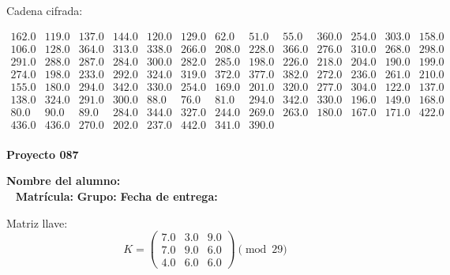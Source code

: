 \documentclass[12pt]{article}
\begin{document}
Cadena cifrada:
\begin{center}
$\begin{array}{lllllllllllll}
162.0 & 119.0 & 137.0 & 144.0 & 120.0 & 129.0 & 62.0 & 51.0 & 55.0 & 360.0 & 254.0 & 303.0 & 158.0\\
106.0 & 128.0 & 364.0 & 313.0 & 338.0 & 266.0 & 208.0 & 228.0 & 366.0 & 276.0 & 310.0 & 268.0 & 298.0\\
291.0 & 288.0 & 287.0 & 284.0 & 300.0 & 282.0 & 285.0 & 198.0 & 226.0 & 218.0 & 204.0 & 190.0 & 199.0\\
274.0 & 198.0 & 233.0 & 292.0 & 324.0 & 319.0 & 372.0 & 377.0 & 382.0 & 272.0 & 236.0 & 261.0 & 210.0\\
155.0 & 180.0 & 294.0 & 342.0 & 330.0 & 254.0 & 169.0 & 201.0 & 320.0 & 277.0 & 304.0 & 122.0 & 137.0\\
138.0 & 324.0 & 291.0 & 300.0 & 88.0 & 76.0 & 81.0 & 294.0 & 342.0 & 330.0 & 196.0 & 149.0 & 168.0\\
80.0 & 90.0 & 89.0 & 284.0 & 344.0 & 327.0 & 244.0 & 269.0 & 263.0 & 180.0 & 167.0 & 171.0 & 422.0\\
436.0 & 436.0 & 270.0 & 202.0 & 237.0 & 442.0 & 341.0 & 390.0\\
\end{array}$
\end{center}

\newpage


\textbf{Proyecto 087}

\textbf{Nombre del alumno:} \underline{\hspace{13cm}}\\\
\vspace{1cm}
\textbf{Matrícula:} \underline{\hspace{4cm}} \hspace{1cm}
\textbf{Grupo:} \underline{\hspace{2cm}}
\textbf{Fecha de entrega:} \underline{\hspace{2cm}}

\medskip

Matriz llave:
\[
K = \begin{pmatrix}
7.0 & 3.0 & 9.0\\
7.0 & 9.0 & 6.0\\
4.0 & 6.0 & 6.0
\end{pmatrix} \pmod{29}
\]
\end{document}
